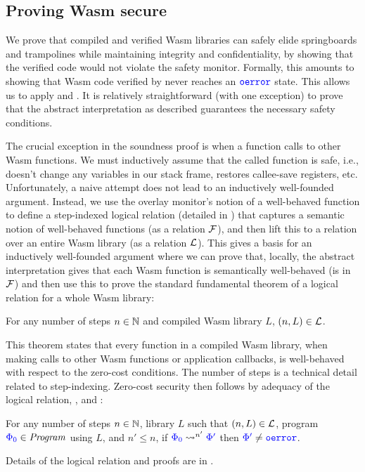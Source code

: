 \subsection{Proving Wasm secure}
\label{sec:wasm-proof}
%
We prove that compiled and verified Wasm libraries can safely elide springboards and
trampolines while maintaining integrity and confidentiality, by showing that the
verified code would not violate the safety monitor.
%
Formally, this amounts to showing that Wasm code verified by \verifname{} never
reaches an ${\color{blue}{\mathtt{oerror}}}$ state.
%
This allows us to apply  and
.
%
It is relatively straightforward (with one exception) to prove that the abstract
interpretation as described guarantees the necessary safety conditions.

The crucial exception in the soundness proof is when a function calls to other Wasm
functions.
%
We must inductively assume that the called function is safe, i.e.,
doesn't change any variables in our stack frame, restores callee-save registers,
etc.
%
Unfortunately, a naive attempt does not lead to an inductively well-founded
argument.
%
Instead, we use the overlay monitor's notion of a well-behaved function to
define a step-indexed logical relation (detailed in
) that captures a semantic notion of
well-behaved functions (as a relation $\mathcal{F}$), and then lift this to a relation
over an entire Wasm library (as a relation $\mathcal{L}$).
%
This gives a basis for an inductively well-founded argument where we can prove
that, locally, the abstract interpretation gives that each Wasm function is
semantically well-behaved (is in $\mathcal{F}$) and then use this to prove the
standard fundamental theorem of a logical relation for a whole Wasm library:
%
\begin{theorem} \label{thm:wasm-in-lrel}
  For any number of steps $n \in \mathbb{N}$ and compiled Wasm library $L$,
  $(n, L) \in \mathcal{L}$.
\end{theorem}
%
\noindent
This theorem states that every function in a compiled Wasm library,
when making calls to other Wasm functions or application callbacks, is
well-behaved with respect to the zero-cost conditions.
%
The number of steps is a technical detail related to step-indexing.
%
Zero-cost security then follows by adequacy of the logical relation,
, and
:
%
\begin{theorem} \label{thm:lrel-adequacy}
  For any number of steps $n \in \mathbb{N}$, library $L$ such that $(n, L) \in
  \mathcal{L}$, program ${\color{blue}{\Phi_0}} \in \mathit{Program}$ using $L$, and $n' \leq n$, if
  ${\color{blue}{\Phi_0}} \mathrel{\mathrel{\leadsto}^{n'}} {\color{blue}{\Phi'}}$ then ${\color{blue}{\Phi'}} \neq {\color{blue}{\mathtt{oerror}}}$.
\end{theorem}
%
\noindent
Details of the logical relation and proofs are in
.
